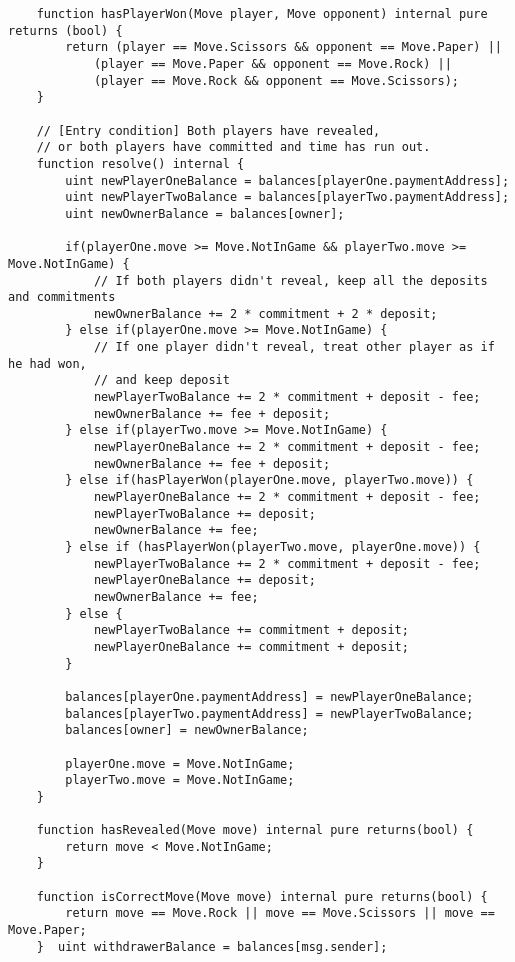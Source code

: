 \begin{verbatim}
    function hasPlayerWon(Move player, Move opponent) internal pure returns (bool) {
        return (player == Move.Scissors && opponent == Move.Paper) ||
            (player == Move.Paper && opponent == Move.Rock) ||
            (player == Move.Rock && opponent == Move.Scissors);
    }    

    // [Entry condition] Both players have revealed,
    // or both players have committed and time has run out.
    function resolve() internal {
        uint newPlayerOneBalance = balances[playerOne.paymentAddress];
        uint newPlayerTwoBalance = balances[playerTwo.paymentAddress];
        uint newOwnerBalance = balances[owner];
        
        if(playerOne.move >= Move.NotInGame && playerTwo.move >= Move.NotInGame) {
            // If both players didn't reveal, keep all the deposits and commitments
            newOwnerBalance += 2 * commitment + 2 * deposit;
        } else if(playerOne.move >= Move.NotInGame) {
            // If one player didn't reveal, treat other player as if he had won,
            // and keep deposit
            newPlayerTwoBalance += 2 * commitment + deposit - fee;
            newOwnerBalance += fee + deposit;
        } else if(playerTwo.move >= Move.NotInGame) {
            newPlayerOneBalance += 2 * commitment + deposit - fee;
            newOwnerBalance += fee + deposit;
        } else if(hasPlayerWon(playerOne.move, playerTwo.move)) {
            newPlayerOneBalance += 2 * commitment + deposit - fee;
            newPlayerTwoBalance += deposit;
            newOwnerBalance += fee;
        } else if (hasPlayerWon(playerTwo.move, playerOne.move)) {
            newPlayerTwoBalance += 2 * commitment + deposit - fee;
            newPlayerOneBalance += deposit;
            newOwnerBalance += fee;
        } else {
            newPlayerTwoBalance += commitment + deposit;
            newPlayerOneBalance += commitment + deposit;
        }
        
        balances[playerOne.paymentAddress] = newPlayerOneBalance;
        balances[playerTwo.paymentAddress] = newPlayerTwoBalance;
        balances[owner] = newOwnerBalance;

        playerOne.move = Move.NotInGame;
        playerTwo.move = Move.NotInGame;
    }
    
    function hasRevealed(Move move) internal pure returns(bool) {
        return move < Move.NotInGame;
    }
    
    function isCorrectMove(Move move) internal pure returns(bool) {
        return move == Move.Rock || move == Move.Scissors || move == Move.Paper;
    }  uint withdrawerBalance = balances[msg.sender];
        

\end{verbatim}
